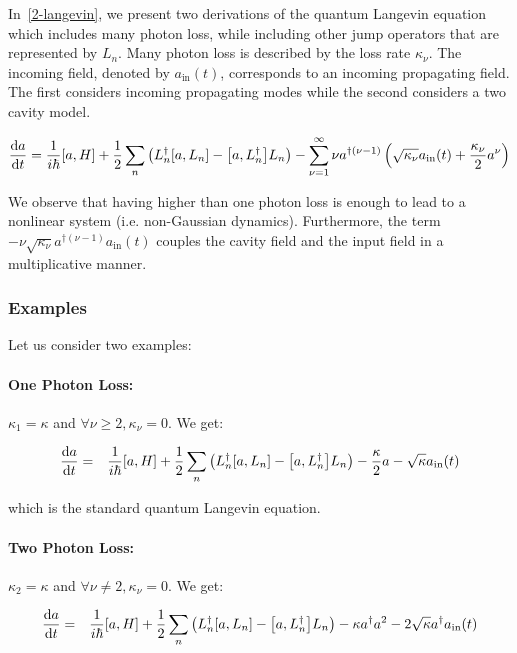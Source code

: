 In~\autoref{2-langevin}, we present two derivations of the quantum Langevin equation which includes many photon loss, while including other jump operators that are represented by $L_n$. Many photon loss is described by the loss rate $\kappa_\nu$. The incoming field, denoted by $a_{\text{in}}(t)$, corresponds to an incoming propagating field. The first considers incoming propagating modes while the second considers a two cavity model.

\begin{equation} \label{generalized-langevin}
    \timeDeriv{a} = \ihbar \commutator{a}{H} + \frac{1}{2} \sum_n \left(L^\dagger_n \commutator{a}{L_n} - \commutator{a}{L^\dagger_n} L_n\right) - \sum_{\nu = 1}^\infty \nu a^{\dagger (\nu-1)} \left( \sqrt{\kappa_\nu}  a_{\text{in}}(t) + \frac{\kappa_\nu}{2}a^\nu \right)
\end{equation}

We observe that having higher than one photon loss is enough to lead to a nonlinear system (i.e. non-Gaussian dynamics). Furthermore, the term $- \nu \sqrt{\kappa_\nu} a^{\dagger (\nu-1)} a_{\text{in}}(t)$ couples the cavity field and the input field in a multiplicative manner.

\subsubsection{Examples}

Let us consider two examples:

\paragraph{One Photon Loss:} $\kappa_1 = \kappa$ and $\forall \nu \ge 2, \kappa_\nu = 0$. We get:

\begin{eqnarray}
    \timeDeriv{a} &=& \ihbar \commutator{a}{H} + \frac{1}{2} \sum_n \left(L^\dagger_n \commutator{a}{L_n} - \commutator{a}{L^\dagger_n} L_n\right) - \frac{\kappa}{2}a - \sqrt{\kappa}  a_{\text{in}}(t) 
\end{eqnarray}

which is the standard quantum Langevin equation.

\paragraph{Two Photon Loss:} $\kappa_2 = \kappa$ and $\forall \nu \neq 2, \kappa_\nu = 0$. We get:

\begin{eqnarray}
    \timeDeriv{a} &=& \ihbar \commutator{a}{H} + \frac{1}{2} \sum_n \left(L^\dagger_n \commutator{a}{L_n} - \commutator{a}{L^\dagger_n} L_n\right) -\kappa a^\dagger a^2 - 2 \sqrt{\kappa}  a^\dagger a_{\text{in}}(t)
\end{eqnarray}

